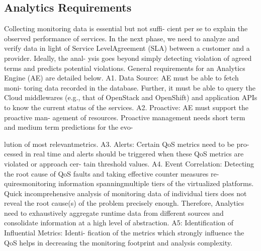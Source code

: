 \subsection{Analytics Requirements}

Collecting monitoring data is essential but not suffi- cient per se to explain the observed performance of services. In the next phase, we need to analyze and verify data in light of Service LevelAgreement (SLA) between a customer and a provider. Ideally, the anal- ysis goes beyond simply detecting violation of agreed terms and predicts potential violations. General requirements for an Analytics Engine
(AE) are detailed below. A1. Data Source: AE must be able to fetch moni- toring data recorded in the database. Further, it must be able to query the Cloud middlewares (e.g., that of OpenStack and OpenShift) and application APIs to know the current status of the services. A2. Proactive: AE must support the proactive man- agement of resources. Proactive management needs short term and medium term predictions for the evo-

lution of most relevantmetrics. A3. Alerts: Certain QoS metrics need to be pro- cessed in real time and alerts should be triggered when these QoS metrics are violated or approach cer- tain threshold values. A4. Event Correlation: Detecting the root cause of QoS faults and taking effective counter measures re- quiresmonitoring information spanningmultiple tiers of the virtualized platforms. Quick incomprehensive analysis of monitoring data of individual tiers does not reveal the root cause(s) of the problem precisely enough. Therefore, Analytics need to exhaustively aggregate runtime data from different sources and consolidate information at a high level of abstraction. A5: Identification of Influential Metrics: Identi- fication of the metrics which strongly influence the QoS helps in decreasing the monitoring footprint and analysis complexity.
